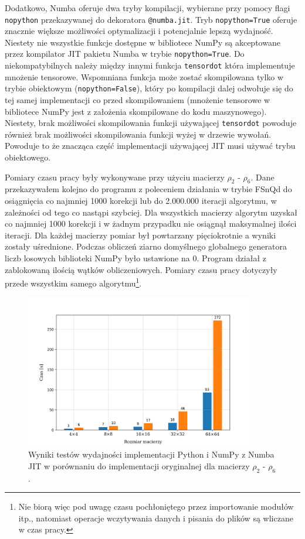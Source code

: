 \documentclass[10pt, a4paper]{article}
\newcommand{\code}[1]{\texttt{#1}}
\begin{document}
\begin{sloppypar}
    Dodatkowo, Numba oferuje dwa tryby kompilacji, wybierane przy pomocy flagi \code{nopython}
    przekazywanej do dekoratora \code{@numba.jit}. Tryb \code{nopython=True} oferuje
    znacznie większe możliwości optymalizacji i potencjalnie lepszą wydajność. Niestety nie
    wszystkie funkcje dostępne w bibliotece NumPy są akceptowane przez kompilator JIT pakietu
    Numba w trybie \code{nopython=True}. Do niekompatybilnych należy między innymi funkcja
    \code{tensordot} która implementuje mnożenie tensorowe. Wspomniana funkcja może zostać
    skompilowana tylko w trybie obiektowym (\code{nopython=False}), który po kompilacji dalej
    odwołuje się do tej samej implementacji co przed skompilowaniem (mnożenie tensorowe
    w bibliotece NumPy jest z założenia skompilowane do kodu maszynowego). Niestety, brak
    możliwości skompilowania funkcji używającej \code{tensordot} powoduje również brak
    możliwości skompilowania funkcji wyżej w drzewie wywołań. Powoduje to że znacząca część
    implementacji używającej JIT musi używać trybu obiektowego.

    Pomiary czasu pracy były wykonywane przy użyciu macierzy $\rho_{2}$ - $\rho_{6}$.
    Dane przekazywałem kolejno do programu z poleceniem działania w trybie FSnQd do
    osiągnięcia co najmniej 1000 korekcji lub do 2.000.000 iteracji algorytmu, w
    zależności od tego co nastąpi szybciej. Dla wszystkich macierzy algorytm uzyskał co najmniej
    1000 korekcji i w żadnym przypadku nie osiągnął maksymalnej ilości iteracji. Dla
    każdej macierzy pomiar był powtarzany pięciokrotnie a wyniki zostały uśrednione. Podczas
    obliczeń ziarno domyślnego globalnego generatora liczb losowych biblioteki NumPy było
    ustawione na 0. Program działał z zablokowaną ilością wątków obliczeniowych. Pomiary
    czasu pracy dotyczyły przede wszystkim samego algorytmu\footnote{Nie biorą więc pod uwagę
    czasu pochłoniętego przez importowanie modułów itp., natomiast operacje wczytywania danych
    i pisania do plików są wliczane w czas pracy.}.

    \FloatBarrier
    \begin{figure}[ht]
      \centering
      \includegraphics[width=0.9\textwidth]{"resources/benchmark_4/plot.png"}
      \caption{Wyniki testów wydajności implementacji Python i NumPy z Numba JIT w porównaniu do implementacji oryginalnej dla macierzy $\rho
      _{2}$ - $\rho_{6}$ .}
      \label{third-perf}
    \end{figure}
    \FloatBarrier


\end{sloppypar}
\end{document}
